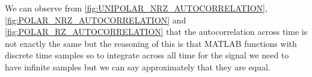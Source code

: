 We can observe from \autoref{fig:UNIPOLAR_NRZ_AUTOCORRELATION},
\autoref{fig:POLAR_NRZ_AUTOCORRELATION} and
\autoref{fig:POLAR_RZ_AUTOCORRELATION} that the autocorrelation across time is
not exactly the same but the reasoning of this is that MATLAB functions with
discrete time samples so to integrate across all time for the signal we need to
have infinite samples but we can say approximately that they are equal.